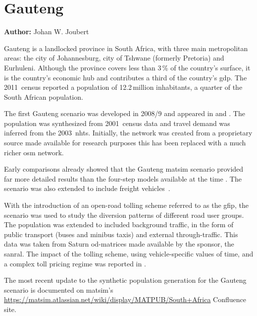 \section{Gauteng}
\label{sec:gauteng}
\hfill \textbf{Author:} Johan W. Joubert


Gauteng is a landlocked province in South Africa, with  three main metropolitan areas: the city of Johannesburg, city of Tshwane (formerly Pretoria) and Eurhuleni. Although the province covers less than 3\,\% of the country's surface, it is the country's economic hub and contributes a third of the country's \gls{gdp}. The 2011~census reported a population of 12.2\,million inhabitants, a quarter of the South African population. 

The first Gauteng scenario was developed in 2008/9 and appeared in \citet[][]{Fourie2009MastersThesis} and \citet[][]{FourieJoubert_SATC_2009}. The population was synthesized from 2001~census data and travel demand was inferred from the 2003~\gls{nhts}. Initially, the network was created from a proprietary source made available for research purposes this has been replaced with a much richer \gls{osm} network.

Early comparisons already showed that the Gauteng \gls{matsim} scenario provided far more detailed results than the four-step models available at the time \citep[][]{Fourie_SATC_2010}. The scenario was also extended to include freight vehicles~\citep[][]{JoubertJEtAl_TRR_2010}.

With the introduction of an open-road tolling scheme referred to as the \gls{gfip}, the scenario was used to study the diversion patterns of different road user groups. The population was extended to included background traffic, in the form of public transport (buses and minibus taxis) and external through-traffic. This data was taken from Saturn \gls{od}-matrices made available by the sponsor, the \gls{sanral}. The impact of the tolling scheme, using vehicle-specific values of time, and a complex toll pricing regime was reported in \citet[][]{NagelKickhoeferJoubert2014HeterogeneousVoTsPROCEDIA}.

The most recent update to the synthetic population generation for the Gauteng scenario is documented on \gls{matsim}'s \url{https://matsim.atlassian.net/wiki/display/MATPUB/South+Africa} Confluence site.


